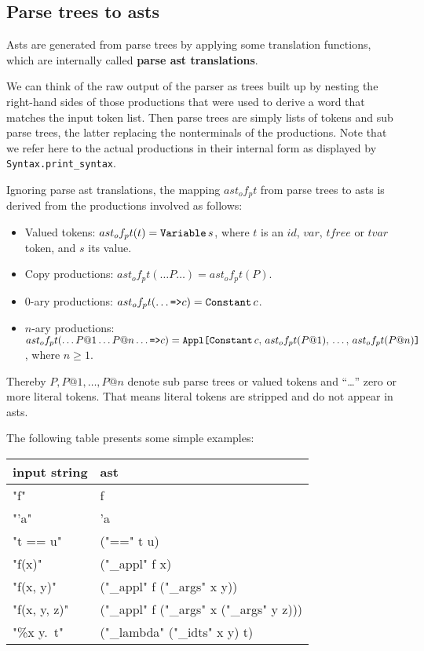 \subsection{Parse trees to asts}

Asts are generated from parse trees by applying some translation functions,
which are internally called {\bf parse ast translations}.

We can think of the raw output of the parser as trees built up by nesting the
right-hand sides of those productions that were used to derive a word that
matches the input token list. Then parse trees are simply lists of tokens and
sub parse trees, the latter replacing the nonterminals of the productions.
Note that we refer here to the actual productions in their internal form as
displayed by {\tt Syntax.print_syntax}.

Ignoring parse ast translations, the mapping
$ast_of_pt$ from parse trees to asts is derived
from the productions involved as follows:
\begin{itemize}
  \item Valued tokens: $ast_of_pt(t) = \mathop{\mbox{\tt Variable}}\nolimits s$, where $t$ is an $id$,
    $var$, $tfree$ or $tvar$ token, and $s$ its value.

  \item Copy productions: $ast_of_pt(\ldots P \ldots) = ast_of_pt(P)$.

  \item $0$-ary productions: $ast_of_pt(\ldots \mbox{\tt =>} c) = \mathop{\mbox{\tt Constant}}\nolimits c$.

  \item $n$-ary productions: $ast_of_pt(\ldots P@1 \ldots P@n \ldots \mtt{=>}
    c) = \Appl{\Constant c,$ $ast_of_pt(P@1),$ $\ldots,$ $ast_of_pt(P@n)}$,
    where $n \ge 1$.
\end{itemize}
Thereby $P, P@1, \ldots, P@n$ denote sub parse trees or valued tokens and
``\dots'' zero or more literal tokens. That means literal tokens are stripped
and do not appear in asts.

The following table presents some simple examples:

{\tt\begin{tabular}{ll}
\rm input string    & \rm ast \\\hline
"f"                 & f \\
"'a"                & 'a \\
"t == u"            & ("==" t u) \\
"f(x)"              & ("_appl" f x) \\
"f(x, y)"           & ("_appl" f ("_args" x y)) \\
"f(x, y, z)"        & ("_appl" f ("_args" x ("_args" y z))) \\
"\%x y.\ t"         & ("_lambda" ("_idts" x y) t) \\
\end{tabular}}

